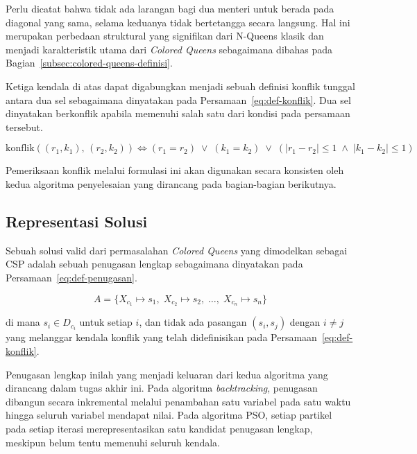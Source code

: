 Perlu dicatat bahwa tidak ada larangan bagi dua menteri untuk berada pada diagonal yang sama, selama keduanya tidak bertetangga secara langsung. Hal ini merupakan perbedaan struktural yang signifikan dari N-Queens klasik dan menjadi karakteristik utama dari \textit{Colored Queens} sebagaimana dibahas pada Bagian~\ref{subsec:colored-queens-definisi}.

Ketiga kendala di atas dapat digabungkan menjadi sebuah definisi konflik tunggal antara dua sel sebagaimana dinyatakan pada Persamaan~\ref{eq:def-konflik}. Dua sel dinyatakan berkonflik apabila memenuhi salah satu dari kondisi pada persamaan tersebut.

\begin{equation}
	\text{konflik}((r_1, k_1),\, (r_2, k_2)) \iff (r_1 = r_2) \;\lor\; (k_1 = k_2) \;\lor\; (|r_1 - r_2| \leq 1 \;\land\; |k_1 - k_2| \leq 1)
	\label{eq:def-konflik}
\end{equation}

Pemeriksaan konflik melalui formulasi ini akan digunakan secara konsisten oleh kedua algoritma penyelesaian yang dirancang pada bagian-bagian berikutnya.

\subsection{Representasi Solusi}
\label{subsec:representasi-solusi}

Sebuah solusi valid dari permasalahan \textit{Colored Queens} yang dimodelkan sebagai CSP adalah sebuah penugasan lengkap sebagaimana dinyatakan pada Persamaan~\ref{eq:def-penugasan}.

\begin{equation}
	A = \{X_{c_1} \mapsto s_1,\; X_{c_2} \mapsto s_2,\; \dots,\; X_{c_n} \mapsto s_n\}
	\label{eq:def-penugasan}
\end{equation}

di mana $s_i \in D_{c_i}$ untuk setiap $i$, dan tidak ada pasangan $(s_i, s_j)$ dengan $i \neq j$ yang melanggar kendala konflik yang telah didefinisikan pada Persamaan~\ref{eq:def-konflik}.

Penugasan lengkap inilah yang menjadi keluaran dari kedua algoritma yang dirancang dalam tugas akhir ini. Pada algoritma \textit{backtracking}, penugasan dibangun secara inkremental melalui penambahan satu variabel pada satu waktu hingga seluruh variabel mendapat nilai. Pada algoritma PSO, setiap partikel pada setiap iterasi merepresentasikan satu kandidat penugasan lengkap, meskipun belum tentu memenuhi seluruh kendala.

